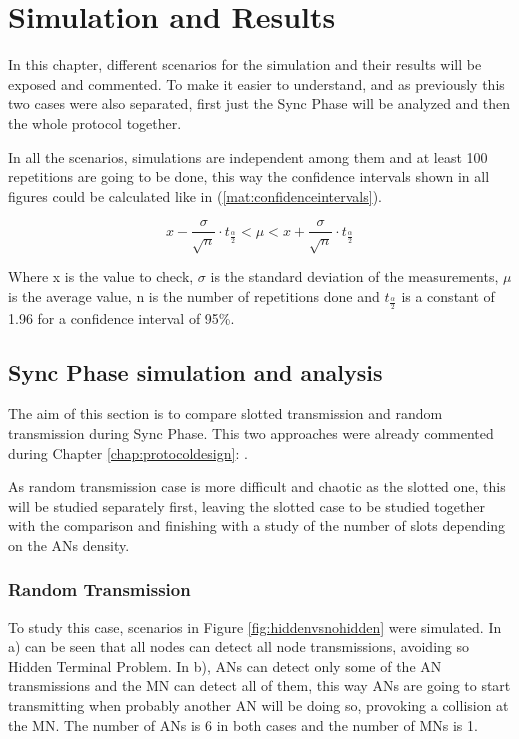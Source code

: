 \chapter{Simulation and Results}
\label{chap:simulationandresults}

In this chapter, different scenarios for the simulation and their results will be exposed and commented. To make it easier to understand, and as 
previously this two cases were also separated, first just the Sync Phase will be analyzed and then the whole protocol together.

In all the scenarios, simulations are independent among them and at least 100 repetitions are going to be done, this way the confidence intervals
shown in all figures could be calculated like in (\ref{mat:confidenceintervals}).

\begin{equation}
  x-\frac{\sigma}{\sqrt{n}}\cdot t_{\frac{\alpha}{2}} < \mu < x+\frac{\sigma}{\sqrt{n}}\cdot t_{\frac{\alpha}{2}}
  \label{mat:confidenceintervals}
\end{equation}

Where x is the value to check, $\sigma$ is the standard deviation of the measurements, $\mu$ is the average value, n is the number of repetitions done and 
$t_{\frac{\alpha}{2}}$ is a constant of 1.96 for a confidence interval of 95\%.

\section{Sync Phase simulation and analysis}

The aim of this section is to compare slotted transmission and random transmission during Sync Phase. This two approaches were already commented 
during Chapter \ref{chap:protocoldesign}: .

As random transmission case is more difficult and chaotic as the slotted one, this will be studied separately first, leaving the slotted case to 
be studied together with the comparison and finishing with a study of the number of slots depending on the \acp{AN} density.

\subsection{Random Transmission}

To study this case, scenarios in Figure \ref{fig:hiddenvsnohidden} were simulated. In a) can be seen that all nodes can detect all node transmissions,
avoiding so Hidden Terminal Problem. In b), \acp{AN} can detect only some of the \ac{AN} transmissions and the \ac{MN} can detect all of them, this way
\acp{AN} are going to start transmitting when probably another \ac{AN} will be doing so, provoking a collision at the \ac{MN}. The number of \acp{AN}
is 6 in both cases and the number of \acp{MN} is 1.

